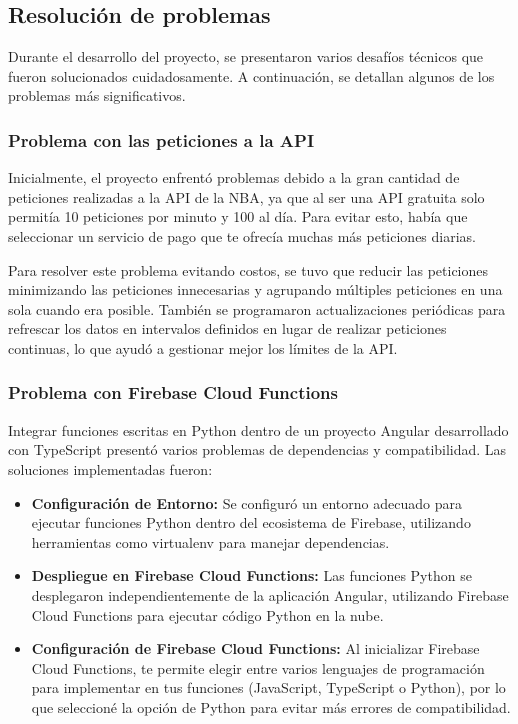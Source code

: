 \subsection{Resolución de problemas}
Durante el desarrollo del proyecto, se presentaron varios desafíos técnicos que fueron solucionados cuidadosamente. A continuación, se detallan algunos de los problemas más significativos.

\subsubsection{Problema con las peticiones a la API}
Inicialmente, el proyecto enfrentó problemas debido a la gran cantidad de peticiones realizadas a la API de la NBA, ya que al ser una API gratuita solo permitía 10 peticiones por minuto y 100 al día. Para evitar esto, había que seleccionar un servicio de pago que te ofrecía muchas más peticiones diarias. 

Para resolver este problema evitando costos, se tuvo que reducir las peticiones minimizando las peticiones innecesarias y agrupando múltiples peticiones en una sola cuando era posible. También se programaron actualizaciones periódicas para refrescar los datos en intervalos definidos en lugar de realizar peticiones continuas, lo que ayudó a gestionar mejor los límites de la API.

\subsubsection{Problema con Firebase Cloud Functions}
Integrar funciones escritas en Python dentro de un proyecto Angular desarrollado con TypeScript presentó varios problemas de dependencias y compatibilidad.
Las soluciones implementadas fueron:
\begin{itemize}
\tightlist
    \item 
        \textbf{Configuración de Entorno:} Se configuró un entorno adecuado para ejecutar funciones Python dentro del ecosistema de Firebase, utilizando herramientas como virtualenv para manejar dependencias.
    \item 
        \textbf{Despliegue en Firebase Cloud Functions:} Las funciones Python se desplegaron independientemente de la aplicación Angular, utilizando Firebase Cloud Functions para ejecutar código Python en la nube.
    \item 
        \textbf{Configuración de Firebase Cloud Functions:} Al inicializar Firebase Cloud Functions, te permite elegir entre varios lenguajes de programación para implementar en tus funciones (JavaScript, TypeScript o Python), por lo que seleccioné la opción de Python para evitar más errores de compatibilidad.
\end{itemize}

